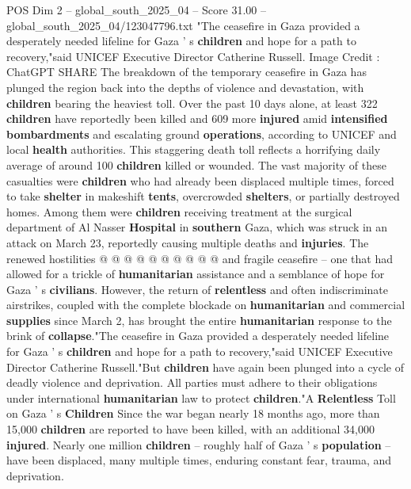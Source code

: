\begin{textsample}{POS Dim 2 – global\_south\_2025\_04 – Score 31.00 – global\_south\_2025\_04/123047796.txt}  \label{ex:f2_pos_272}
"The ceasefire in Gaza provided a desperately needed lifeline for Gaza ' s \textbf{children} and hope for a path to recovery,"said UNICEF Executive Director Catherine Russell.
Image Credit : ChatGPT SHARE The breakdown of the temporary ceasefire in Gaza has plunged the region back into the depths of violence and devastation, with \textbf{children} bearing the heaviest toll.
Over the past 10 days alone, at least 322 \textbf{children} have reportedly been killed and 609 more \textbf{injured} amid \textbf{intensified} \textbf{bombardments} and escalating ground \textbf{operations}, according to UNICEF and local \textbf{health} authorities.
This staggering death toll reflects a horrifying daily average of around 100 \textbf{children} killed or wounded.
The vast majority of these casualties were \textbf{children} who had already been displaced multiple times, forced to take \textbf{shelter} in makeshift \textbf{tents}, overcrowded \textbf{shelters}, or partially destroyed homes.
Among them were \textbf{children} receiving treatment at the surgical department of Al Nasser \textbf{Hospital} in \textbf{southern} Gaza, which was struck in an attack on March 23, reportedly causing multiple deaths and \textbf{injuries}.
The renewed hostilities @ @ @ @ @ @ @ @ @ @ and fragile ceasefire -- one that had allowed for a trickle of \textbf{humanitarian} assistance and a semblance of hope for Gaza ' s \textbf{civilians}.
However, the return of \textbf{relentless} and often indiscriminate airstrikes, coupled with the complete blockade on \textbf{humanitarian} and commercial \textbf{supplies} since March 2, has brought the entire \textbf{humanitarian} response to the brink of \textbf{collapse}."The ceasefire in Gaza provided a desperately needed lifeline for Gaza ' s \textbf{children} and hope for a path to recovery,"said UNICEF Executive Director Catherine Russell."But \textbf{children} have again been plunged into a cycle of deadly violence and deprivation.
All parties must adhere to their obligations under international \textbf{humanitarian} law to protect \textbf{children}."A \textbf{Relentless} Toll on Gaza ' s \textbf{Children} Since the war began nearly 18 months ago, more than 15,000 \textbf{children} are reported to have been killed, with an additional 34,000 \textbf{injured}.
Nearly one million \textbf{children} -- roughly half of Gaza ' s \textbf{population} -- have been displaced, many multiple times, enduring constant fear, trauma, and deprivation.

\end{textsample}
